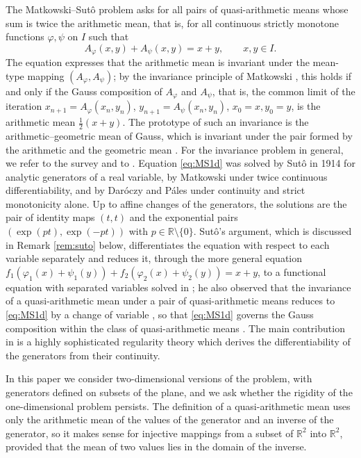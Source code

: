 \documentclass[a4paper, reqno, 11pt]{amsart}
\theoremstyle{definition}
\begin{document}
The Matkowski--Sut\^o problem asks for all pairs of quasi-arithmetic means whose sum is twice the arithmetic mean, that is, for all continuous strictly monotone functions $\varphi, \psi$ on $I$ such that
\begin{equation}\label{eq:MS1d}
A_{\varphi}(x,y) + A_{\psi}(x,y) = x + y, \qquad x, y \in I .
\end{equation}
The equation expresses that the arithmetic mean is invariant under the mean-type mapping $(A_{\varphi}, A_{\psi})$; by the invariance principle of Matkowski \cite{Matkowski99b}, this holds if and only if the Gauss composition of $A_{\varphi}$ and $A_{\psi}$, 
that is, the common limit of the iteration $x_{n+1} = A_{\varphi}(x_n, y_n)$, $y_{n+1} = A_{\psi}(x_n, y_n)$, $x_0 = x, y_0 = y$, is the arithmetic mean $\tfrac{1}{2} (x+y)$.
The prototype of such an invariance is the arithmetic--geometric mean of Gauss, which is invariant under the pair formed by the arithmetic and the geometric mean \cite{Cox}. 
For the invariance problem in general, we refer to the survey \cite{JarczykJarczyk} and to \cite{Nielsen23}.
Equation \eqref{eq:MS1d} was solved by Sut\^o \cite{Suto1, Suto2} in 1914 for analytic generators of a real variable, by Matkowski \cite{Matkowski} under twice continuous differentiability, and by Dar\'oczy and P\'ales \cite{DP} under continuity and strict monotonicity alone.
Up to affine changes of the generators, the solutions are the pair of identity maps $(t,t)$ and the exponential pairs $(\exp(pt), \exp(-pt))$ with $p \in \mathbb{R} \setminus \{0\}$.
Sut\^o's argument, which is discussed in Remark \ref{rem:suto} below, differentiates the equation with respect to each variable separately and reduces it, through the more general equation $f_1(\varphi_1(x) + \psi_1(y)) + f_2(\varphi_2(x) + \psi_2(y)) = x + y$, to a functional equation with separated variables solved in \cite{Suto1}; he also observed that the invariance of a quasi-arithmetic mean under a pair of quasi-arithmetic means reduces to \eqref{eq:MS1d} by a change of variable \cite[Section  3]{Suto2}, so that \eqref{eq:MS1d} governs the Gauss composition within the class of quasi-arithmetic means \cite{DP}.
The main contribution in \cite{DP} is a highly sophisticated regularity theory which derives the differentiability of the generators from their continuity. 

In this paper we consider two-dimensional versions of the problem, with generators defined on subsets of the plane, and we ask whether the rigidity of the one-dimensional problem persists.
The definition of a quasi-arithmetic mean uses only the arithmetic mean of the values of the generator and an inverse of the generator, so it makes sense for injective mappings from a subset of $\mathbb{R}^2$ into $\mathbb{R}^2$, provided that the mean of two values lies in the domain of the inverse.
\end{document}
